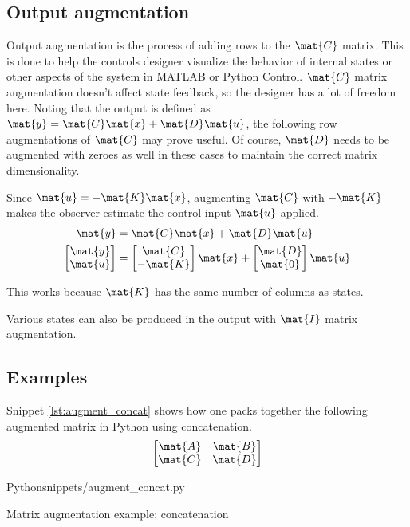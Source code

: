 \subsection{Output augmentation}

Output augmentation is the process of adding rows to the $\mat{C}$ matrix. This
is done to help the controls designer visualize the behavior of internal states
or other aspects of the \gls{system} in MATLAB or Python Control. $\mat{C}$
matrix augmentation doesn't affect \gls{state} feedback, so the designer has a
lot of freedom here. Noting that the \gls{output} is defined as
$\mat{y} = \mat{C}\mat{x} + \mat{D}\mat{u}$, the following row augmentations of
$\mat{C}$ may prove useful. Of course, $\mat{D}$ needs to be augmented with
zeroes as well in these cases to maintain the correct matrix dimensionality.

Since $\mat{u} = -\mat{K}\mat{x}$, augmenting $\mat{C}$ with $-\mat{K}$ makes
the \gls{observer} estimate the \gls{control input} $\mat{u}$ applied.
\begin{align*}
  \mat{y} &= \mat{C}\mat{x} + \mat{D}\mat{u} \\
  \begin{bmatrix}
    \mat{y} \\
    \mat{u}
  \end{bmatrix} &=
  \begin{bmatrix}
    \mat{C} \\
    -\mat{K}
  \end{bmatrix}
  \mat{x} +
  \begin{bmatrix}
    \mat{D} \\
    \mat{0}
  \end{bmatrix}
  \mat{u}
\end{align*}

This works because $\mat{K}$ has the same number of columns as \glspl{state}.

Various \glspl{state} can also be produced in the \gls{output} with $\mat{I}$
matrix augmentation.

\subsection{Examples}

Snippet \ref{lst:augment_concat} shows how one packs together the following
augmented matrix in Python using concatenation.
\begin{equation*}
  \begin{bmatrix}
    \mat{A} & \mat{B} \\
    \mat{C} & \mat{D}
  \end{bmatrix}
\end{equation*}
\begin{code}{Python}{snippets/augment_concat.py}
  \caption{Matrix augmentation example: concatenation}
  \label{lst:augment_concat}
\end{code}

